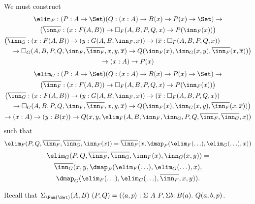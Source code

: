 \documentclass{article}
\begin{document}
We must construct
\begin{multline*}
  \elim_{F} : (P : A \to \Set)(Q : (x : A) \to B(x) \to P(x) \to \Set) \to \\
 \big(\overline{\inn_F} : (x : F(A, B)) \to \square_{F}(A, B, P, Q, x) \to P(\inn_F(x))\big) \\
 \begin{multlined}
   \big( \overline{\inn_G} : (x : F(A, B)) \to (y : G(A, B, \inn_F, x)) \to
   (\overline{x} : \square_F(A, B, P, Q, x)) \\ \to
   \square_{G}(A, B, P, Q, \inn_F, \overline{\inn_F}, x, y,
   \overline{x}) \to Q(\inn_F(x), \inn_{G}(x, y), \overline{\inn_F}(x, \overline{x}))\big)
 \end{multlined} \\
  \to (x : A) \to P(x)
\end{multline*}
\begin{multline*}
  \elim_{G} : (P : A \to \Set)(Q : (x : A) \to B(x) \to P(x) \to \Set) \to \\
 \big(\overline{\inn_F} : (x : F(A, B)) \to \square_{F}(A, B, P, Q, x) \to P(\inn_F(x))\big) \\
 \begin{multlined}
   \big( \overline{\inn_G} : (x : F(A, B)) \to (y : G(A, B, \inn_F, x)) \to
   (\overline{x} : \square_F(A, B, P, Q, x)) \\ \to
   \square_{G}(A, B, P, Q, \inn_F, \overline{\inn_F}, x, y,
   \overline{x}) \to Q(\inn_F(x), \inn_{G}(x, y), \overline{\inn_F}(x, \overline{x}))\big)
 \end{multlined} \\
  \to (x : A) \to (y : B(x)) \to Q(x, y, \elim_F(A, B, \inn_F, \inn_G, P, Q, \overline{\inn_F}, \overline{\inn_G}, x))
\end{multline*}
such that
\[
\elim_F(P, Q, \overline{\inn_F}, \overline{\inn_G}, \inn_F(x)) = 
\overline{\inn_F}(x, \dmap_F(\elim_F(\ldots), \elim_G(\ldots), x))
\]
\begin{multline*}
\elim_G(P, Q, \overline{\inn_F}, \overline{\inn_G}, \inn_F(x), \inn_G(x, y)) = \\
\overline{\inn_G}(x, y, \dmap_F(\elim_F(\ldots), \elim_G(\ldots), x),  \\ \dmap_G(\elim_F(\ldots), \elim_G(\ldots), \overline{\inn_F}, x, y)).
\end{multline*}

Recall that $\Sigma_{\Fam(\Set)}(A, B)\ (P, Q) = (\langle a, p\rangle
: \Sigma\ A\ P, \Sigma b\!:\!B(a).\ Q(a, b, p)$.
\end{document}
